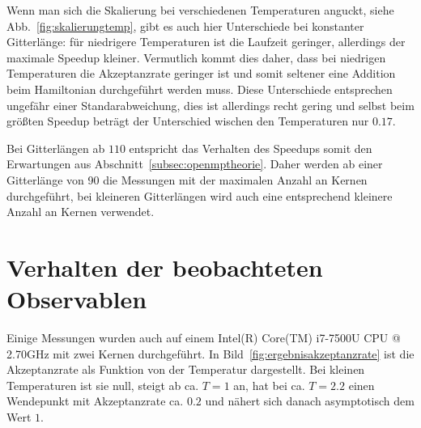 	Wenn man sich die Skalierung bei verschiedenen Temperaturen anguckt, siehe Abb.~\ref{fig:skalierungtemp}, gibt es auch hier Unterschiede bei konstanter Gitterlänge: für niedrigere Temperaturen ist die Laufzeit geringer, allerdings der maximale Speedup kleiner. Vermutlich kommt dies daher, dass bei niedrigen Temperaturen die Akzeptanzrate geringer ist und somit seltener eine Addition beim Hamiltonian durchgeführt werden muss. Diese Unterschiede entsprechen ungefähr einer Standarabweichung, dies ist allerdings recht gering und selbst beim größten Speedup beträgt der Unterschied wischen den Temperaturen nur $\num{0,17}$.
	
	Bei Gitterlängen ab $110$ entspricht das Verhalten des Speedups somit den Erwartungen aus Abschnitt~\ref{subsec:openmptheorie}. Daher werden ab einer Gitterlänge von 90 die Messungen mit der maximalen Anzahl an Kernen durchgeführt, bei kleineren Gitterlängen wird auch eine entsprechend kleinere Anzahl an Kernen verwendet. 
	

	
	
	
	\section{Verhalten der beobachteten Observablen}
	\label{sec:ergebnisobservablen}
	
	Einige Messungen wurden auch auf einem Intel(R) Core(TM) i7-7500U CPU @ 2.70GHz mit zwei Kernen durchgeführt. 
	In Bild~\ref{fig:ergebnisakzeptanzrate} ist die Akzeptanzrate als Funktion von der Temperatur dargestellt. Bei kleinen Temperaturen ist sie null, steigt ab ca. $T=1$ an, hat bei ca. $T=\num{2,2}$ einen Wendepunkt mit Akzeptanzrate ca. $\num{0,2}$ und nähert sich danach asymptotisch dem Wert $1$. 
	
	
